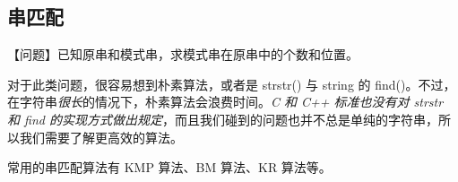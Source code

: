 \subsection{串匹配}
	【问题】已知原串和模式串，求模式串在原串中的个数和位置。
	
	对于此类问题，很容易想到朴素算法，或者是 strstr() 与 string 的 find()。不过，在字符串\emph{很长}的情况下，朴素算法会浪费时间。\emph{C 和 C++ 标准也没有对 strstr 和 find 的实现方式做出规定}，而且我们碰到的问题也并不总是单纯的字符串，所以我们需要了解更高效的算法。
	
	常用的串匹配算法有 KMP 算法、BM 算法、KR 算法等。

	
	
